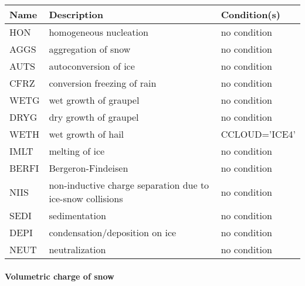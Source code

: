 \begin{longtable} {|p{}|p{}|p{}|}
\hline
Name & Description & Condition(s) \\
\hline \hline
\endhead
HON    & homogeneous nucleation         & no condition \\\hline
AGGS   & aggregation of snow            & no condition \\\hline
AUTS   & autoconversion of ice          & no condition \\\hline
CFRZ   & conversion freezing of rain    & no condition \\\hline
WETG   & wet growth of graupel          & no condition \\\hline
DRYG   & dry growth of graupel          & no condition \\\hline
WETH   & wet growth of hail             & CCLOUD='ICE4' \\\hline
IMLT   & melting of ice                 & no condition \\\hline
BERFI  & Bergeron-Findeisen             & no condition \\\hline
NIIS   & non-inductive charge separation due to ice-snow collisions & no condition \\\hline
SEDI   & sedimentation                  & no condition \\\hline
DEPI   & condensation/deposition on ice & no condition \\\hline
NEUT   & neutralization                 & no condition \\\hline
\end{longtable}

\paragraph{Volumetric charge of snow}
\mbox{} %

